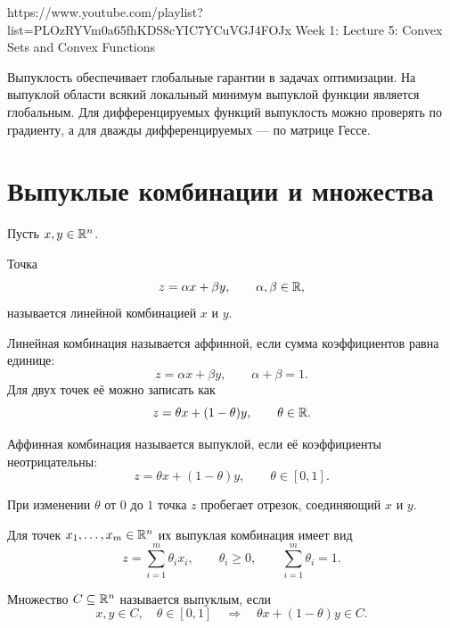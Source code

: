 
\sourcevideo
    {https://www.youtube.com/playlist?list=PLOzRYVm0a65fhKDS8cYIC7YCuVGJ4FOJx}
    {Week 1: Lecture 5: Convex Sets and Convex Functions}

Выпуклость обеспечивает глобальные гарантии в задачах оптимизации.
На выпуклой области всякий локальный минимум выпуклой функции является
глобальным. Для дифференцируемых функций выпуклость можно проверять по
градиенту, а для дважды дифференцируемых --- по матрице Гессе.

\section{Выпуклые комбинации и множества}

Пусть \(x,y\in\mathbb{R}^n\).

\begin{definition}
Точка
\[
    z=\alpha x+\beta y,
    \qquad
    \alpha,\beta\in\mathbb{R},
\]
называется линейной комбинацией \(x\) и \(y\).
\end{definition}

\begin{definition}
Линейная комбинация называется аффинной, если сумма коэффициентов
равна единице:
\[
    z=\alpha x+\beta y,
    \qquad
    \alpha+\beta=1.
\]
Для двух точек её можно записать как
\[
    z=\theta x+(1-\theta)y,
    \qquad
    \theta\in\mathbb{R}.
\]
\end{definition}

\begin{definition}
Аффинная комбинация называется выпуклой, если её коэффициенты
неотрицательны:
\[
    z=\theta x+(1-\theta)y,
    \qquad
    \theta\in[0,1].
\]
\end{definition}

При изменении \(\theta\) от \(0\) до \(1\) точка \(z\) пробегает
отрезок, соединяющий \(x\) и \(y\).

Для точек \(x_1,\ldots,x_m\in\mathbb{R}^n\) их выпуклая комбинация имеет вид
\[
    z=\sum_{i=1}^{m}\theta_i x_i,
    \qquad
    \theta_i\ge0,
    \qquad
    \sum_{i=1}^{m}\theta_i=1.
\]



\begin{definition}
Множество \(C\subseteq\mathbb{R}^n\) называется выпуклым, если
\[
    x,y\in C,\quad \theta\in[0,1]
    \quad\Longrightarrow\quad
    \theta x+(1-\theta)y\in C.
\]
\end{definition}

